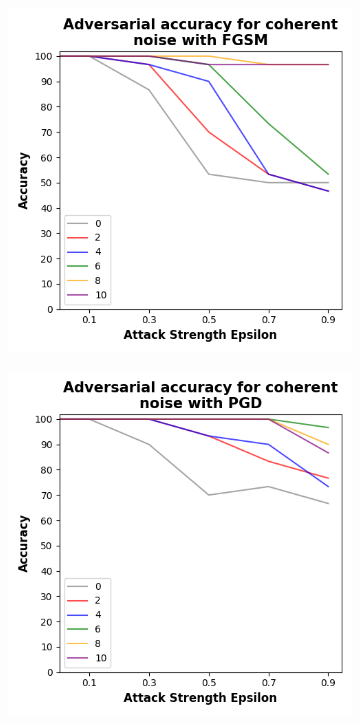 \begin{figure}[!h]
  \centering

  \begin{subfigure}{0.45\textwidth}
      \includegraphics[width=\linewidth]{figures/evaluation_results/iris/pqc/figures/coherent-fgsm.png}
      \label{fig:iris9}
  \end{subfigure} \qquad
  \begin{subfigure}{0.45\textwidth}
      \includegraphics[width=\linewidth]{figures/evaluation_results/iris/pqc/figures/coherent-pgd.png}

\end{subfigure}
\end{figure}
